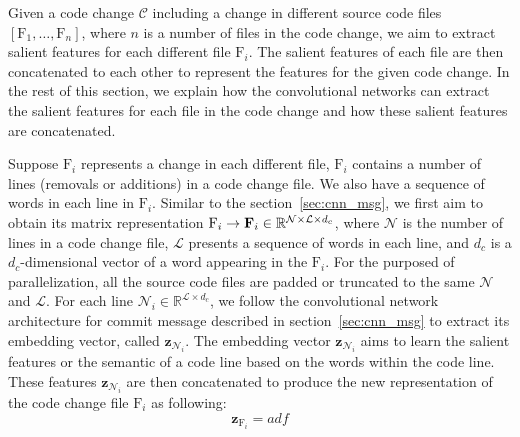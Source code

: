 Given a code change $\mathcal{C}$ including a change in different source code files $[\text{F}_1, \dots, \text{F}_n]$, where $n$ is a number of files in the code change, we aim to extract salient features for each different file $\text{F}_i$. The salient features of each file are then concatenated to each other to represent the features for the given code change. In the rest of this section, we explain how the convolutional networks can extract the salient features for each file in the code change and how these salient features are concatenated. 

Suppose $\text{F}_i$ represents a change in each different file, $\text{F}_i$ contains a number of lines (removals or additions) in a code change file. We also have a sequence of words in each line in $\text{F}_i$. Similar to the section~\ref{sec:cnn_msg}, we first aim to obtain its matrix representation $\text{F}_i \rightarrow \textbf{\text{F}}_i \in \mathbb{R}^{\mathcal{N} \times \mathcal{L} \times{d_c}}$, where $\mathcal{N}$ is the number of lines in a code change file, $\mathcal{L}$ presents a sequence of words in each line, and $d_c$ is a $d_c$-dimensional vector of a word appearing in the $\text{F}_i$. For the purposed of parallelization, all the source code files are padded or truncated to the same $\mathcal{N}$ and $\mathcal{L}$. For each line $\mathcal{N}_i \in \mathbb{R}^{\mathcal{L} \times d_c}$, we follow the convolutional network architecture for commit message described in section~\ref{sec:cnn_msg} to extract its embedding vector, called $\textbf{z}_{\mathcal{N}_i}$. The embedding vector $\textbf{z}_{\mathcal{N}_i}$ aims to learn the salient features or the semantic of a code line based on the words within the code line. These features $\textbf{z}_{\mathcal{N}_i}$ are then concatenated to produce the new representation of the code change file $\text{F}_i$ as following: 
\begin{equation}
\label{eq:concatenate}
\textbf{z}_{\text{F}_i} = adf
\end{equation}


